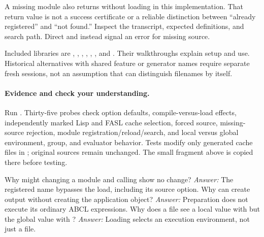 A missing module also returns  without loading in this
implementation. That return value is not a success certificate or a
reliable distinction between ``already registered'' and ``not found.''
Inspect the transcript, expected definitions, and search path. Direct
 and  instead signal an error for missing source.

Included libraries are , , ,
, , , and .
Their walkthroughs explain setup and use. Historical alternatives with
shared feature or generator names require separate fresh sessions, not
an assumption that  can distinguish filenames by itself.

\paragraph{Evidence and check your understanding.}
Run . Thirty-five probes check
option defaults, compile-versus-load effects, independently marked Lisp
and FASL cache selection, forced source, missing-source rejection,
module registration/reload/search, and local versus global environment,
group, and evaluator behavior. Tests modify only generated cache files
in ; original sources remain unchanged.
The small fragment above is copied there before testing.

Why might changing a module and calling  show no change?
\emph{Answer:} The registered name bypasses the load, including its
source option. Why can  create output without creating the
application object? \emph{Answer:} Preparation does not execute its
ordinary ABCL expressions. Why does a file see a local value with
 but the global value with ?
\emph{Answer:} Loading selects an execution environment, not just a file.
